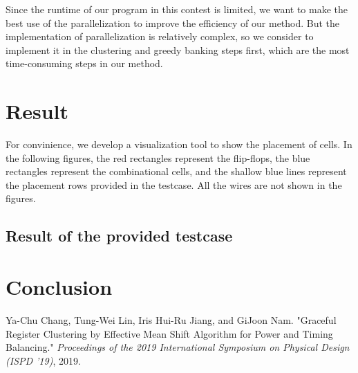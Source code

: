 \documentclass[12pt]{article}
\begin{document}
Since the runtime of our program in this contest is limited, we want to make the best use of the parallelization to improve the efficiency of our method. But the implementation of parallelization is relatively complex, so we consider to implement it in the clustering and greedy banking steps first, which are the most time-consuming steps in our method.


\section{Result}

For convinience, we develop a visualization tool to show the placement of cells. In the following figures, the red rectangles represent the flip-flops, the blue rectangles represent the combinational cells, and the shallow blue lines represent the placement rows provided in the testcase. All the wires are not shown in the figures.

\subsection{Result of the provided testcase}

\section{Conclusion}

\begin{thebibliography}{9}
    Ya-Chu Chang, Tung-Wei Lin, Iris Hui-Ru Jiang, and GiJoon Nam. "Graceful Register Clustering by Effective Mean Shift Algorithm for Power and Timing Balancing." \textit{Proceedings of the 2019 International Symposium on Physical Design (ISPD '19)}, 2019.
\end{thebibliography}
\end{document}
